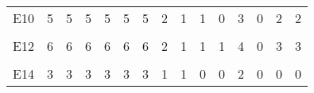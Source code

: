 \begin{table}[H]
\begin{tabular}[t]{lrrrrrrrrrrrrrr}
E10 & 5 & 5 & 5 & 5 & 5 & 5 & 2 & 1 & 1 & 0 & 3 & 0 & 2 & 2\\
\addlinespace
\cellcolor{gray!6}{E11} & \cellcolor{gray!6}{4} & \cellcolor{gray!6}{4} & \cellcolor{gray!6}{4} & \cellcolor{gray!6}{4} & \cellcolor{gray!6}{4} & \cellcolor{gray!6}{4} & \cellcolor{gray!6}{2} & \cellcolor{gray!6}{3} & \cellcolor{gray!6}{1} & \cellcolor{gray!6}{2} & \cellcolor{gray!6}{0} & \cellcolor{gray!6}{2} & \cellcolor{gray!6}{3} & \cellcolor{gray!6}{3}\\
E12 & 6 & 6 & 6 & 6 & 6 & 6 & 2 & 1 & 1 & 1 & 4 & 0 & 3 & 3\\
\cellcolor{gray!6}{E13} & \cellcolor{gray!6}{3} & \cellcolor{gray!6}{3} & \cellcolor{gray!6}{3} & \cellcolor{gray!6}{3} & \cellcolor{gray!6}{3} & \cellcolor{gray!6}{3} & \cellcolor{gray!6}{1} & \cellcolor{gray!6}{1} & \cellcolor{gray!6}{0} & \cellcolor{gray!6}{0} & \cellcolor{gray!6}{2} & \cellcolor{gray!6}{0} & \cellcolor{gray!6}{0} & \cellcolor{gray!6}{0}\\
E14 & 3 & 3 & 3 & 3 & 3 & 3 & 1 & 1 & 0 & 0 & 2 & 0 & 0 & 0\\
\bottomrule
\end{tabular}
\end{table}
